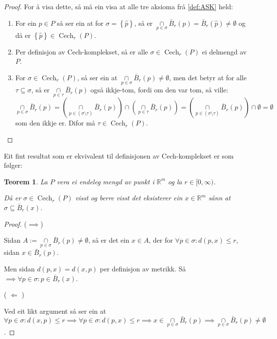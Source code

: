 \documentclass[a4paper, 12pt, norsk]{article}
\theoremstyle{plain}
\newtheorem{theorem}{Teorem}[section]
\theoremstyle{definition}
\newcommand{\Rb}{\mathbb{R}}
\newcommand{\intersect}{ \mathop{\cap}\limits }
\newcommand{\set}[1]{ \left\{ #1 \right\} } %
\DeclareMathOperator{\Cech}{Cech} %
\begin{document}
\begin{proof}
	For å visa dette, så må ein visa at alle tre aksioma frå \autoref{def:ASK} held:
	\begin{enumerate}
		\item{ For ein \( \hat{p} \in P \) så ser ein at for \( \sigma = \set{\hat{p}} \), så er \( \intersect_{p\in\sigma}\bar{B}_r(p)=\bar{B}_r(\hat{p})\neq\emptyset \) og då er \( \set{\hat{p}} \in \Cech_r(P) \). }
		\item{ Per definisjon av Cech-komplekset, så er alle \( \sigma \in \Cech_r(P) \) ei delmengd av \( P \). }
		\item{ For \( \sigma \in \Cech_r(P) \), så ser ein at \( \intersect_{p\in\sigma} \bar{B}_r(p) \neq \emptyset \), men det betyr at for alle \( \tau \subseteq \sigma \), så er \( \intersect_{p\in\tau} \bar{B}_r(p) \) også ikkje-tom, fordi om den var tom, så ville: 
			\[ 
				\intersect_{p\in\sigma} \bar{B}_r(p) = \left( \intersect_{p\in(\sigma\setminus\tau)} \bar{B}_r(p) \right) \intersect \left( \intersect_{p\in\tau} \bar{B}_r(p) \right) = \left( \intersect_{p\in(\sigma\setminus\tau)} \bar{B}_r(p) \right) \intersect \emptyset = \emptyset 
			\] 
			som den ikkje er. Difor må \( \tau \in \Cech_r(P) \). }
	\end{enumerate}
\end{proof}

Eit fint resultat som er ekvivalent til definisjonen av Cech-komplekset er som følger:

\begin{theorem}
	La $P$ vera ei endeleg mengd av punkt i $\Rb^m$ og la $r\in[0, \infty)$.

	Då er \( \sigma \in \Cech_r(P) \) visst og berre visst det eksisterer ein \( x \in \Rb^m \) sånn at \( \sigma \subseteq \bar{B}_r(x) \).
\end{theorem}

\begin{proof}
	($\implies$)
	
	Sidan $A:=\intersect_{p\in\sigma}\bar{B}_r(p)\neq\emptyset$, så er det ein $x\in A$, der for $\forall p\in\sigma: d(p,x)\leq r$, sidan $x\in\bar{B}_r(p)$.
	
	Men sidan $d(p,x)=d(x,p)$ per definisjon av metrikk. 
	Så $\implies \forall p\in\sigma: p \in \bar{B}_r(x)$.
	
	( \( \Longleftarrow \) )
	
	Ved eit likt argument så ser ein at  $\forall p \in \sigma : d(x, p) \leq r \implies \forall p \in \sigma : d(p, x) \leq r \implies x \in \intersect_{p \in \sigma} \bar{B}_r(p) \implies \intersect_{p \in \sigma} \bar{B}_r(p) \neq \emptyset$.
\end{proof}
\end{document}
